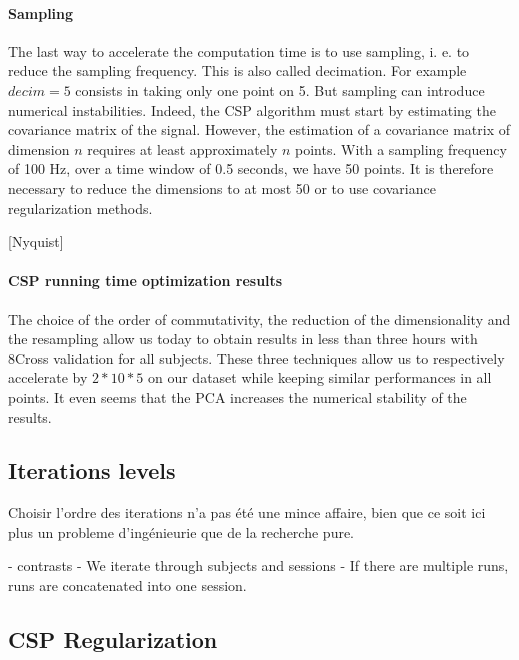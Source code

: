 \paragraph{Sampling}

The last way to accelerate the computation time is to use sampling, i. e. to reduce the sampling frequency. This is also called decimation. For example $decim = 5$ consists in taking only one point on 5. But sampling can introduce numerical instabilities. Indeed, the CSP algorithm must start by estimating the covariance matrix of the signal. However, the estimation of a covariance matrix of dimension $n$ requires at least approximately $n$ points. With a sampling frequency of 100 Hz, over a time window of 0.5 seconds, we have 50 points. It is therefore necessary to reduce the dimensions to at most 50 or to use covariance regularization methods.

[Nyquist]

\paragraph{CSP running time optimization results}

The choice of the order of commutativity, the reduction of the dimensionality and the resampling allow us today to obtain results in less than three hours with 8Cross validation for all subjects. These three techniques allow us to respectively accelerate by $2*10*5$ on our dataset while keeping similar performances in all points. It even seems that the PCA increases the numerical stability of the results.


\subsection{Iterations levels}

Choisir l'ordre des iterations n'a pas été une mince affaire, bien que ce soit ici plus un probleme d'ingénieurie que de la recherche pure.

- contrasts
- We iterate through subjects and sessions
- If there are multiple runs, runs are concatenated into one session.

\subsection{CSP Regularization}

